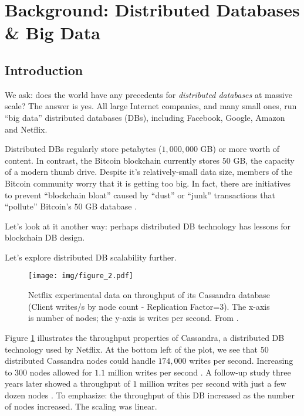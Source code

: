 \section{Background: Distributed Databases \& Big Data}\label{sec:distributed}

\subsection{Introduction}
We ask: does the world have any precedents for \textit{distributed databases} at massive scale? The answer is yes.
All large Internet companies, and many small ones, run “big data” distributed databases (DBs), including Facebook, Google, Amazon and Netflix.

Distributed DBs regularly store petabytes ($1,000,000$ GB) or more worth of content. 
In contrast, the Bitcoin blockchain currently stores $50$ GB, the capacity of a modern thumb drive.
Despite it's relatively-small data size, members of the Bitcoin community worry that it is getting too big. In fact, there are initiatives to prevent “blockchain bloat” caused by “dust” or “junk” transactions that “pollute” Bitcoin’s $50$ GB database \cite{wagner2014blockchain_bloat}.

Let’s look at it another way: perhaps distributed DB technology has lessons for blockchain DB design.

\medskip
\centerline{Let’s explore distributed DB scalability further.}

\begin{figure}[!ht]
  \centering
  \texttt{[image: img/figure\_2.pdf]}
  \caption{Netflix experimental data on throughput of its Cassandra database (Client writes/s by node count - Replication Factor=$3$).
  The x-axis is number of nodes; the y-axis is writes per second. From \cite{cockcroft2011benchmarking}.}
  \label{fig:cassandra_throughput}
\end{figure}

\medskip
Figure \ref{fig:cassandra_throughput} illustrates the throughput properties of Cassandra, a distributed DB technology used by Netflix.
At the bottom left of the plot, we see that $50$ distributed Cassandra nodes could handle $174,000$ writes per second.
Increasing to $300$ nodes allowed for $1.1$ million writes per second \cite{cockcroft2011benchmarking}.
A follow-up study three years later showed a throughput of $1$ million writes per second with just a few dozen nodes \cite{kalantzis_netflix}.
To emphasize: the throughput of this DB increased as the number of nodes increased. The scaling was linear.

